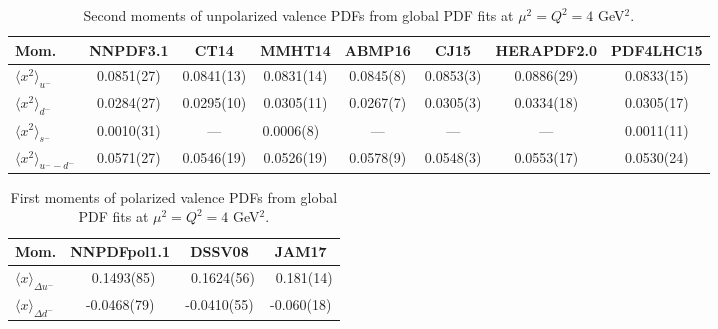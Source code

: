 \begin{table}[!b]
\centering
\small
\begin{tabular}{lccccccc}
\toprule
Mom. & NNPDF3.1 & CT14 & MMHT14 & ABMP16 & CJ15 & HERAPDF2.0 & PDF4LHC15 \\
\midrule
$\langle x^2\rangle_{u^-}$ 
& 0.0851(27) & 0.0841(13) & 0.0831(14)    
& 0.0845(8) & 0.0853(3) & 0.0886(29) & 0.0833(15) \\
$\langle x^2\rangle_{d^-}$
& 0.0284(27) & 0.0295(10) & 0.0305(11)    
& 0.0267(7) & 0.0305(3) & 0.0334(18) & 0.0305(17) \\ 
$\langle x^2\rangle_{s^-}$
& 0.0010(31) & ---        & 0.0006(8)\ \, 
& ---       & ---       & ---        & 0.0011(11) \\
$\langle x^2\rangle_{u^--d^-}$
& 0.0571(27) & 0.0546(19) & 0.0526(19)    
& 0.0578(9) & 0.0548(3) & 0.0553(17) & 0.0530(24) \\
\bottomrule
\end{tabular}
\caption{\small Second moments of unpolarized valence PDFs from 
global PDF fits at $\mu^2=Q^2=4$ GeV$^2$.}
\label{tab:unpHmoms}
\end{table}

\begin{table}[!b]
\centering
\footnotesize
\begin{tabular}{lccc}
\toprule
Mom. & NNPDFpol1.1 & DSSV08 & JAM17\\
\midrule
$\langle x\rangle_{\Delta u^-}$ 
& \ 0.1493(85) & \ 0.1624(56) & \ 0.181(14)\\
$\langle x\rangle_{\Delta d^-}$ 
&  -0.0468(79) &  -0.0410(55) &  -0.060(18)\\
\bottomrule
\end{tabular}
\caption{\small First moments of polarized valence PDFs from global 
PDF fits at $\mu^2=Q^2=4$ GeV$^2$.}
\label{tab:polHmoms}
\end{table}

